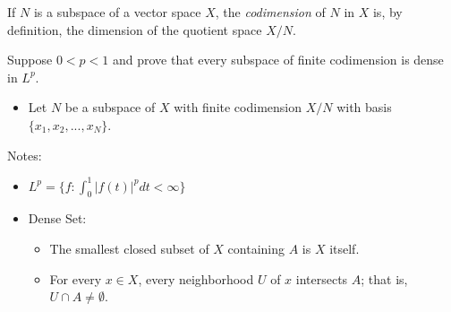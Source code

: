If $N$ is a subspace of a vector space $X$, the \textit{codimension} of $N$ in $X$ is, by definition, the dimension of the quotient space $X/N$.

Suppose $0<p<1$ and prove that every subspace of finite codimension is dense in $L^p$.

\begin{itemize}
    \item Let $N$ be a subspace of $X$ with finite codimension $X/N$ with basis $\{x_1, x_2, ..., x_N\}$.
\end{itemize}




Notes:
\begin{itemize}
    \item $L^p=\{f: \int_0^1|f(t)|^p dt<\infty\}$
    \item Dense Set:
    \begin{itemize}
        \item The smallest closed subset of $X$ containing $A$ is $X$ itself.
        \item For every $x \in X$, every neighborhood $U$ of $x$ intersects $A$; that is, $U \cap A \neq \emptyset$.
    \end{itemize}    
\end{itemize}